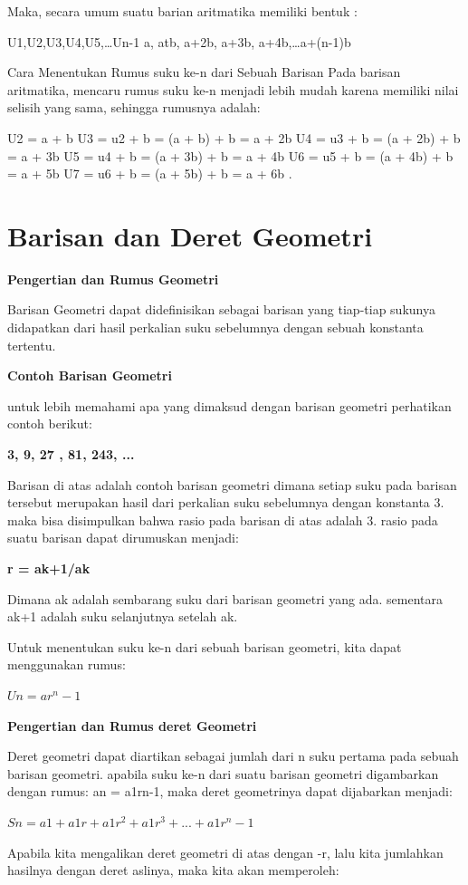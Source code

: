 \documentclass[11pt,fleqn]{book} %
\begin{document}
Maka, secara umum suatu barian aritmatika memiliki bentuk :

U1,U2,U3,U4,U5,…Un-1
a, atb, a+2b, a+3b, a+4b,…a+(n-1)b

Cara Menentukan Rumus suku ke-n dari Sebuah Barisan
Pada barisan aritmatika, mencaru rumus suku ke-n menjadi lebih mudah karena memiliki nilai selisih yang sama, sehingga rumusnya adalah:

U2 = a + b
U3 = u2 + b = (a + b) + b = a + 2b
U4 = u3 + b = (a + 2b) + b = a + 3b
U5 = u4 + b = (a + 3b) + b = a + 4b
U6 = u5 + b = (a + 4b) + b = a + 5b
U7 = u6 + b = (a + 5b) + b = a + 6b
.
\section{Barisan dan Deret Geometri}
\textbf{Pengertian dan Rumus Geometri}

Barisan Geometri dapat didefinisikan sebagai barisan yang tiap-tiap sukunya didapatkan dari hasil perkalian suku sebelumnya dengan sebuah konstanta tertentu.

\textbf{Contoh Barisan Geometri}

 untuk lebih memahami apa yang dimaksud dengan barisan geometri perhatikan contoh berikut:
 
\textbf{3, 9, 27 , 81, 243, ...}

Barisan di atas adalah contoh barisan geometri dimana setiap suku pada barisan tersebut merupakan hasil dari perkalian suku sebelumnya dengan konstanta 3. maka bisa disimpulkan bahwa rasio pada barisan di atas adalah 3. rasio pada suatu barisan dapat dirumuskan menjadi:

\textbf{r = ak+1/ak}

Dimana ak adalah sembarang suku dari barisan geometri yang ada. sementara ak+1 adalah suku selanjutnya setelah ak.

Untuk menentukan suku ke-n dari sebuah barisan geometri, kita dapat menggunakan rumus:

\textbf{$Un = ar^n-1$}

\textbf{ Pengertian dan Rumus deret Geometri}

Deret geometri dapat diartikan sebagai jumlah dari n suku pertama pada sebuah barisan geometri. apabila suku ke-n dari suatu barisan geometri digambarkan dengan rumus: an = a1rn-1, maka deret geometrinya dapat dijabarkan menjadi:

\textbf{$Sn = a1 + a1r + a1r^2 + a1r^3 + ... + a1r^n-1$}

Apabila kita mengalikan deret geometri di atas dengan -r, lalu kita jumlahkan hasilnya dengan deret aslinya, maka kita akan memperoleh:
\end{document}

